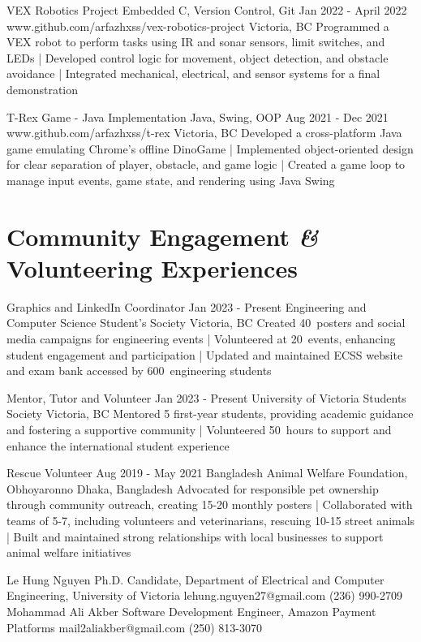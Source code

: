 \documentclass[a4paper,10pt]{article}
\begin{document}
\projectentry
{VEX Robotics Project}
{Embedded C, Version Control, Git}
{Jan 2022 - April 2022}
{www.github.com/arfazhxss/vex-robotics-project}
{Victoria, BC}
{Programmed a VEX robot to perform tasks using IR and sonar sensors, limit switches, and LEDs 
| Developed control logic for movement, object detection, and obstacle avoidance 
| Integrated mechanical, electrical, and sensor systems for a final demonstration 
}

\projectentry
{T-Rex Game - Java Implementation}
{Java, Swing, OOP}
{Aug 2021 - Dec 2021}
{www.github.com/arfazhxss/t-rex}
{Victoria, BC}
{Developed a cross-platform Java game emulating Chrome's offline DinoGame 
| Implemented object-oriented design for clear separation of player, obstacle, and game logic 
| Created a game loop to manage input events, game state, and rendering using Java Swing 
}

\section{Community Engagement \textit{\&} Volunteering Experiences}

\volunteeringexperiences
{Graphics and LinkedIn Coordinator}
{Jan 2023 - Present}
{Engineering and Computer Science Student's Society}
{Victoria, BC}
{Created 40\plus\ posters and social media campaigns for engineering events 
| Volunteered at 20\plus\ events, enhancing student engagement and participation 
| Updated and maintained ECSS website and exam bank accessed by 600\plus\ engineering students
}

\volunteeringexperiences
{Mentor, Tutor and Volunteer}
{Jan 2023 - Present}
{University of Victoria Students Society}
{Victoria, BC}
{Mentored 5 first-year students, providing academic guidance and fostering a supportive community
| Volunteered 50\plus\ hours to support and enhance the international student experience 
}

\volunteeringexperiences
{Rescue Volunteer}
{Aug 2019 - May 2021}
{Bangladesh Animal Welfare Foundation, Obhoyaronno}
{Dhaka, Bangladesh}
{Advocated for responsible pet ownership through community outreach, creating 15-20 monthly posters 
| Collaborated with teams of 5-7, including volunteers and veterinarians, rescuing 10-15 street animals 
| Built and maintained strong relationships with local businesses to support animal welfare initiatives
}

\begin{references}
        {Le Hung Nguyen}
        {Ph.D. Candidate, Department of Electrical and}
        {Computer Engineering, University of Victoria}
        {lehung.nguyen27@gmail.com}
        {(236) 990-2709}
    \hfill
        {Mohammad Ali Akber}
        {Software Development Engineer,}
        {Amazon Payment Platforms}
        {mail2aliakber@gmail.com}
        {(250) 813-3070}
\end{references}
\end{document}

